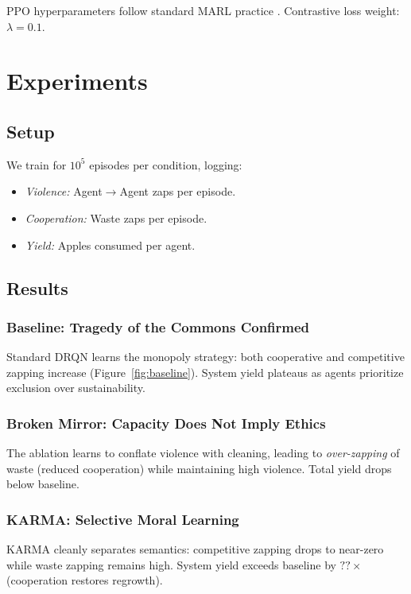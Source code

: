\documentclass[11pt]{article}
\begin{document}
PPO hyperparameters follow standard MARL practice \citep{foerster2018counterfactual}. Contrastive loss weight: $\lambda=0.1$.

\section{Experiments}

\subsection{Setup}

We train for $10^5$ episodes per condition, logging:
\begin{itemize}
\item \emph{Violence:} Agent$\rightarrow$Agent zaps per episode.
\item \emph{Cooperation:} Waste zaps per episode.
\item \emph{Yield:} Apples consumed per agent.
\end{itemize}

\subsection{Results}

\subsubsection{Baseline: Tragedy of the Commons Confirmed}

Standard DRQN learns the monopoly strategy: both cooperative and competitive zapping increase (Figure~\ref{fig:baseline}). System yield plateaus as agents prioritize exclusion over sustainability.

\subsubsection{Broken Mirror: Capacity Does Not Imply Ethics}

The ablation learns to conflate violence with cleaning, leading to \emph{over-zapping} of waste (reduced cooperation) while maintaining high violence. Total yield drops below baseline.

\subsubsection{KARMA: Selective Moral Learning}

KARMA cleanly separates semantics: competitive zapping drops to near-zero while waste zapping remains high. System yield exceeds baseline by $??\times$ (cooperation restores regrowth).
\end{document}
